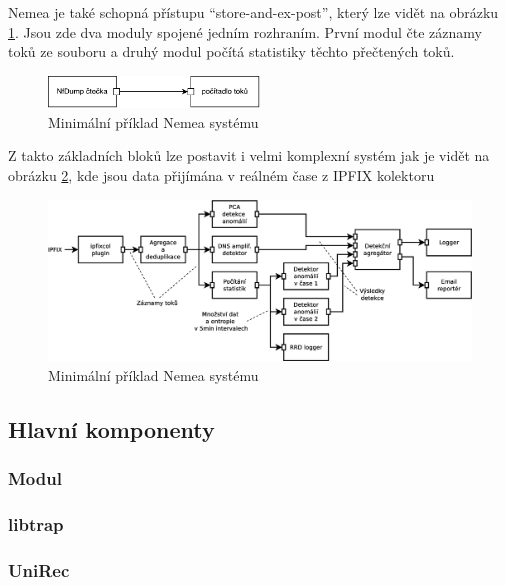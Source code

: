 Nemea je také schopná přístupu ``store-and-ex-post'', který lze vidět na obrázku \ref{fig:nemea-schema}. Jsou zde dva moduly spojené jedním rozhraním. První modul čte záznamy toků ze souboru a druhý modul počítá statistiky těchto přečtených toků. 
\begin{figure}[ht]
  \centering
    \includegraphics[width=0.5\textwidth]{fig/nemea-basic.pdf}
  \caption{Minimální příklad Nemea systému} \label{fig:nemea-schema}
  
\end{figure}

Z takto základních bloků lze postavit i velmi komplexní systém jak je vidět na obrázku \ref{fig:nemea-example-2}, kde jsou data přijímána v reálném čase z IPFIX\cite{ipfix} kolektoru

\begin{figure}
  \centering
    \includegraphics[width=1\textwidth]{fig/nemea-example-2-cz.eps}
  \caption{Minimální příklad Nemea systému} \label{fig:nemea-example-2}
  
\end{figure}




\subsection*{Hlavní komponenty}

\subsubsection{Modul}

\subsubsection{libtrap}

\subsubsection{UniRec}

